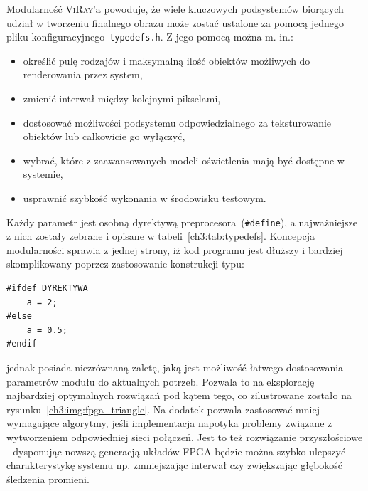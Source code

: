 Modularność \textsc{ViRay}'a powoduje, że wiele kluczowych podsystemów biorących udział w tworzeniu finalnego obrazu może zostać ustalone za pomocą jednego pliku konfiguracyjnego~\texttt{typedefs.h}. Z jego pomocą można m. in.:
\begin{itemize}
\item określić pulę rodzajów i maksymalną ilość obiektów możliwych do renderowania przez system,
\item zmienić interwał między kolejnymi pikselami,
\item dostosować możliwości podsystemu odpowiedzialnego za teksturowanie obiektów lub całkowicie go wyłączyć,
\item wybrać, które z zaawansowanych modeli oświetlenia mają być dostępne w systemie,
\item usprawnić szybkość wykonania w środowisku testowym.
\end{itemize}
Każdy parametr jest osobną dyrektywą preprocesora~(\texttt{\#define}), a najważniejsze z nich zostały zebrane i opisane w tabeli~\ref{ch3:tab:typedefs}. Koncepcja modularności sprawia z jednej strony, iż kod programu jest dłuższy i bardziej skomplikowany poprzez zastosowanie konstrukcji typu:
\begin{lstlisting}
#ifdef DYREKTYWA
	a = 2;
#else
	a = 0.5;
#endif
\end{lstlisting}
jednak posiada niezrównaną zaletę, jaką jest możliwość łatwego dostosowania parametrów modułu do aktualnych potrzeb. Pozwala to na eksplorację najbardziej optymalnych rozwiązań pod kątem tego, co zilustrowane zostało na rysunku~\ref{ch3:img:fpga_triangle}. Na dodatek pozwala zastosować mniej wymagające algorytmy, jeśli implementacja napotyka problemy związane z wytworzeniem odpowiedniej sieci połączeń. Jest to też rozwiązanie przyszłościowe - dysponując nowszą generacją układów FPGA będzie można szybko ulepszyć charakterystykę systemu np. zmniejszając interwał czy zwiększając głębokość śledzenia promieni.



